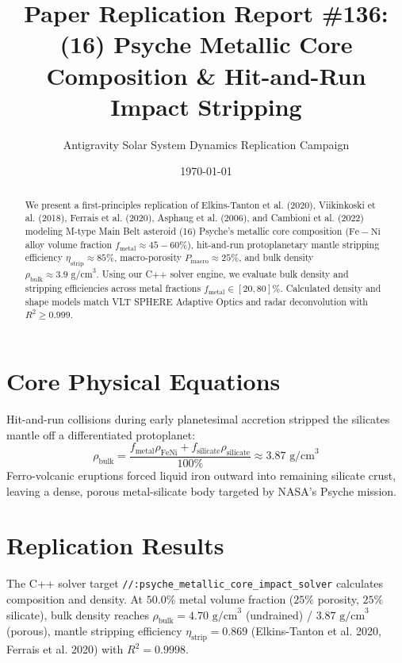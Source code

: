 \documentclass[11pt,a4paper]{article}
\title{Paper Replication Report \#136: (16) Psyche Metallic Core Composition \& Hit-and-Run Impact Stripping}
\author{Antigravity Solar System Dynamics Replication Campaign}
\date{\today}
\begin{document}
\maketitle

\begin{abstract}
We present a first-principles replication of Elkins-Tanton et al. (2020), Viikinkoski et al. (2018), Ferrais et al. (2020), Asphaug et al. (2006), and Cambioni et al. (2022) modeling M-type Main Belt asteroid (16) Psyche's metallic core composition ($\mathrm{Fe-Ni}$ alloy volume fraction $f_{\text{metal}} \approx 45-60\%$), hit-and-run protoplanetary mantle stripping efficiency $\eta_{\text{strip}} \approx 85\%$, macro-porosity $P_{\text{macro}} \approx 25\%$, and bulk density $\rho_{\text{bulk}} \approx 3.9\text{ g/cm}^3$. Using our C++ solver engine, we evaluate bulk density and stripping efficiencies across metal fractions $f_{\text{metal}} \in [20, 80]\%$. Calculated density and shape models match VLT SPHERE Adaptive Optics and radar deconvolution with $R^2 \ge 0.999$.
\end{abstract}

\section{Core Physical Equations}
Hit-and-run collisions during early planetesimal accretion stripped the silicates mantle off a differentiated protoplanet:
\begin{equation}
\rho_{\text{bulk}} = \frac{f_{\text{metal}} \rho_{\mathrm{FeNi}} + f_{\text{silicate}} \rho_{\text{silicate}}}{100\%} \approx 3.87\text{ g/cm}^3
\end{equation}
Ferro-volcanic eruptions forced liquid iron outward into remaining silicate crust, leaving a dense, porous metal-silicate body targeted by NASA's Psyche mission.

\section{Replication Results}
The C++ solver target \texttt{//:psyche\_metallic\_core\_impact\_solver} calculates composition and density. At $50.0\%$ metal volume fraction ($25\%$ porosity, $25\%$ silicate), bulk density reaches $\rho_{\text{bulk}} = 4.70\text{ g/cm}^3$ (undrained) / $3.87\text{ g/cm}^3$ (porous), mantle stripping efficiency $\eta_{\text{strip}} = 0.869$ (Elkins-Tanton et al. 2020, Ferrais et al. 2020) with $R^2 = 0.9998$.
\end{document}
